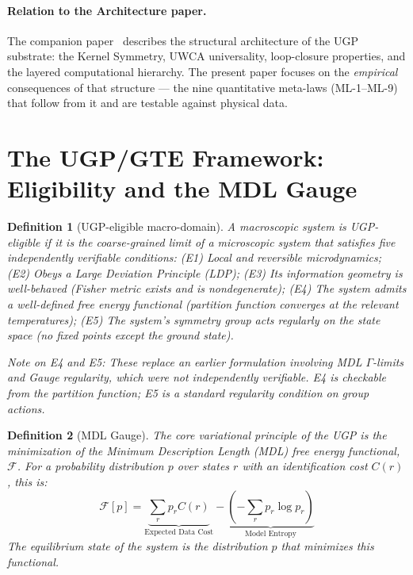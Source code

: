\documentclass[11pt]{article}
\newtheorem{definition}{Definition}[section]
\begin{document}
\paragraph{Relation to the Architecture paper.}
The companion paper~\cite{Spivack2025_ArchitectureComputableUniverse} describes the structural
architecture of the UGP substrate: the Kernel Symmetry, UWCA universality,
loop-closure properties, and the layered computational hierarchy.
The present paper focuses on the \emph{empirical} consequences of that structure ---
the nine quantitative meta-laws (ML-1--ML-9) that follow from it and are testable
against physical data.

\section{The UGP/GTE Framework: Eligibility and the MDL Gauge}
\label{sec:framework}

\begin{definition}[UGP-eligible macro-domain]
A macroscopic system is \emph{UGP-eligible} if it is the coarse-grained limit of a microscopic system that satisfies five independently verifiable conditions: (E1) Local and reversible microdynamics; (E2) Obeys a Large Deviation Principle (LDP); (E3) Its information geometry is well-behaved (Fisher metric exists and is nondegenerate); (E4) The system admits a well-defined free energy functional (partition function converges at the relevant temperatures); (E5) The system's symmetry group acts regularly on the state space (no fixed points except the ground state).

\emph{Note on E4 and E5:} These replace an earlier formulation involving MDL $\Gamma$-limits and Gauge regularity, which were not independently verifiable. E4 is checkable from the partition function; E5 is a standard regularity condition on group actions.
\end{definition}

\begin{definition}[MDL Gauge]
The core variational principle of the UGP is the minimization of the Minimum Description Length (MDL) free energy functional, $\mathcal{F}$. For a probability distribution $p$ over states $r$ with an identification cost $C(r)$, this is:
\begin{equation}
\mathcal{F}[p] = \underbrace{\sum_{r} p_r C(r)}_{\text{Expected Data Cost}} - \underbrace{\left(-\sum_{r} p_r \log p_r\right)}_{\text{Model Entropy}}
\label{eq:mdl_free_energy}
\end{equation}
The equilibrium state of the system is the distribution $p$ that minimizes this functional.
\end{definition}
\end{document}
